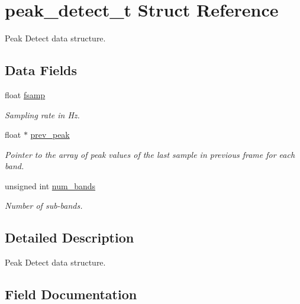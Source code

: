 \hypertarget{structpeak__detect__t}{}\section{peak\+\_\+detect\+\_\+t Struct Reference}
\label{structpeak__detect__t}


Peak Detect data structure.  


\subsection*{Data Fields}
\begin{DoxyCompactItemize}
\item 
float \mbox{\hyperlink{structpeak__detect__t_a1d0565d56fe1cef7323916452a05f204}{fsamp}}
\begin{DoxyCompactList}\small\item\em Sampling rate in Hz. \end{DoxyCompactList}\item 
float $\ast$ \mbox{\hyperlink{structpeak__detect__t_a8496e738e882dd4cd75279b874ed9297}{prev\+\_\+peak}}
\begin{DoxyCompactList}\small\item\em Pointer to the array of peak values of the last sample in previous frame for each band. \end{DoxyCompactList}\item 
unsigned int \mbox{\hyperlink{structpeak__detect__t_a18c7ff3dea1f1dafdab996fe12814366}{num\+\_\+bands}}
\begin{DoxyCompactList}\small\item\em Number of sub-\/bands. \end{DoxyCompactList}\end{DoxyCompactItemize}


\subsection{Detailed Description}
Peak Detect data structure. 

\subsection{Field Documentation}
\mbox{\label{structpeak__detect__t_a1d0565d56fe1cef7323916452a05f204}} 

